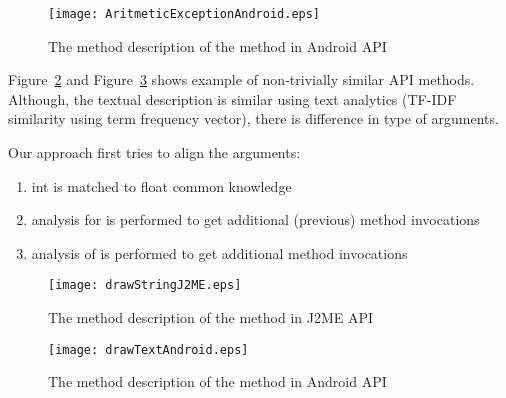 \begin{figure}[t]
\begin{CodeOut}
\begin{alltt}
\texttt{[image: AritmeticExceptionAndroid.eps]}
\end{alltt}
\end{CodeOut}
\caption{\label{fig:excpAPIAndroid} The method description of the  method in Android API}
\end{figure}

Figure~\ref{fig:drawCharAPIJ2ME} and Figure~\ref{fig:drawTextAPIJ2ME} shows example of non-trivially similar API methods. Although, the textual description is similar using text analytics (TF-IDF similarity using term frequency vector), there is difference in type of arguments.

Our approach first tries to align the arguments:
\begin{enumerate}
\item int is matched to float common knowledge
\item {} analysis for  is performed to get additional (previous) method invocations
\item {} analysis of  is performed to get additional method invocations
\end{enumerate}



\begin{figure}[t]
\begin{CodeOut}
\begin{alltt}
\texttt{[image: drawStringJ2ME.eps]}
\end{alltt}
\end{CodeOut}
\caption{\label{fig:drawCharAPIJ2ME} The method description of the  method in J2ME API}
\end{figure}

\begin{figure}[t]
\begin{CodeOut}
\begin{alltt}
\texttt{[image: drawTextAndroid.eps]}
\end{alltt}
\end{CodeOut}
\caption{\label{fig:drawTextAPIJ2ME} The method description of the  method in Android API}
\end{figure}